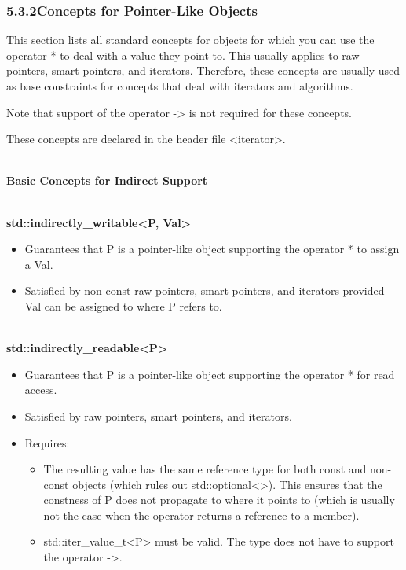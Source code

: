 \subsubsection*{ 5.3.2\hspace{0.2cm}Concepts for Pointer-Like Objects}

This section lists all standard concepts for objects for which you can use the operator * to deal with a value they point to. This usually applies to raw pointers, smart pointers, and iterators. Therefore, these concepts are usually used as base constraints for concepts that deal with iterators and algorithms.

Note that support of the operator -> is not required for these concepts.

These concepts are declared in the header file <iterator>.


\noindent
\hspace*{\fill} \\ %
\textbf{Basic Concepts for Indirect Support}

\noindent
\hspace*{\fill} \\ %
\textbf{std::indirectly\_writable<P, Val>}

\begin{itemize}
\item
Guarantees that P is a pointer-like object supporting the operator * to assign a Val.
	
\item
Satisfied by non-const raw pointers, smart pointers, and iterators provided Val can be assigned to where P refers to.
\end{itemize}


\noindent
\hspace*{\fill} \\ %
\textbf{std::indirectly\_readable<P>}

\begin{itemize}
\item
Guarantees that P is a pointer-like object supporting the operator * for read access.

\item
Satisfied by raw pointers, smart pointers, and iterators.


\item
Requires:
\begin{itemize}
\item
The resulting value has the same reference type for both const and non-const objects (which rules out std::optional<>). This ensures that the constness of P does not propagate to where it points to (which is usually not the case when the operator returns a reference to a member).

\item
std::iter\_value\_t<P> must be valid. The type does not have to support the operator ->.
\end{itemize}
\end{itemize}

